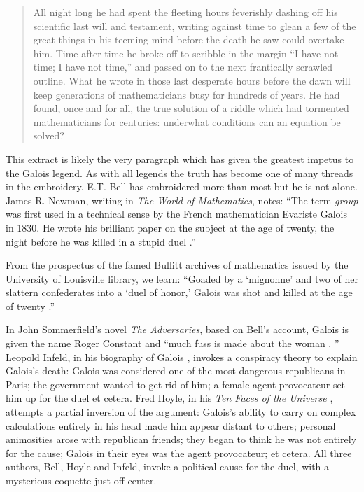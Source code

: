 \documentclass[12pt]{article}
\begin{document}
\begin{quote}
All night long he had spent the fleeting hours feverishly dashing off his scientific last will and testament, writing against time to glean a few of the great things in his teeming mind before the death he saw could overtake him. Time after time he broke off to scribble in the margin ``I have not time; I have not time,'' and passed on to the next frantically scrawled outline. What he wrote in those last desperate hours before the dawn will keep generations of mathematicians busy for hundreds of years. He had found, once and for all, the true solution of a riddle which had tormented mathematicians for centuries: underwhat conditions can an equation be solved? \cite{2}
\end{quote}
This extract is likely the very paragraph which has given the greatest impetus to the Galois legend. As with all legends the truth has become one of many threads in the embroidery. E.T. Bell has embroidered more than most but he is not alone. James R. Newman, writing in {\it The World of Mathematics}, notes: ``The term {\it group} was first used in a technical sense by the French mathematician Evariste Galois in 1830. He wrote his brilliant paper on the subject at the age of twenty, the night before he was killed in a stupid duel \cite{3}.'' 

From the prospectus of the famed Bullitt archives of mathematics issued by the University of Louisville library, we learn: ``Goaded by a `mignonne' and two of her slattern confederates into a `duel of honor,' Galois was shot and killed at the age of twenty \cite{4}.'' 

In John Sommerfield's novel \emph{The Adversaries}, based on Bell's account, Galois is given the name Roger Constant and ``much fuss is made about the woman \cite{5}. ''  Leopold Infeld, in his biography of Galois \cite{6}, invokes a conspiracy theory to explain Galois's death: Galois was considered one of the most dangerous republicans in Paris; the government wanted to get rid of him; a female agent provocateur set him up for the duel et cetera. Fred Hoyle, in his \emph{Ten Faces of the Universe} \cite{7}, attempts a partial inversion of the argument: Galois's ability to carry on complex calculations entirely in his head made him appear distant to others; personal animosities arose with republican friends; they began to think he was not entirely for the cause; Galois in their eyes was the agent provocateur; et cetera. All three authors, Bell, Hoyle and Infeld, invoke a political cause for the duel, with a mysterious coquette just off center.
\end{document}
